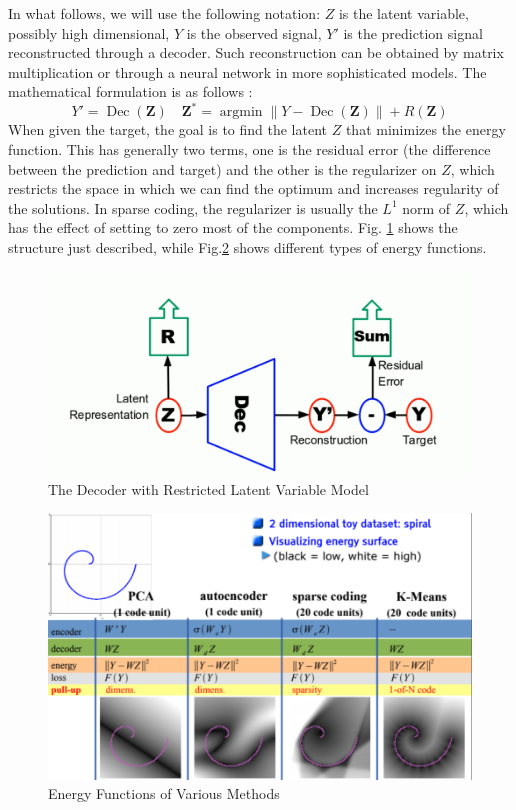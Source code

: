 In what follows, we will use the following notation: $Z$ is the latent variable, possibly high dimensional, $Y$ is the observed signal, $Y'$ is the prediction signal reconstructed through a decoder. Such reconstruction can be obtained by matrix multiplication or through a neural network in more sophisticated models. The mathematical formulation is as follows : 
\[Y'=\operatorname{Dec}(\mathbf{Z}) \quad \mathbf{Z}^{*}=\operatorname{argmin}\|Y-\operatorname{Dec}(\mathbf{Z})\|+R(\mathbf{Z})\]
When given the target, the goal is to find the latent $Z$ that minimizes the energy function. This has generally two terms, one is the residual error (the difference between the prediction and target) and the other is the regularizer on $Z$, which restricts the space in which we can find the optimum and increases regularity of the solutions. In sparse coding, the regularizer is usually the $L^1$ norm of $Z$, which has the effect of setting to zero most of the components. Fig. \ref{fig:decoder} shows the structure just described, while Fig.\ref{fig:energy} shows different types of energy functions.
\begin{figure}[H]
\centering
\includegraphics[width=1.0\linewidth]{figs/decoder.png}
\caption{The Decoder with Restricted Latent Variable Model}
\label{fig:decoder}
\end{figure}
\begin{figure}[H]
\centering
\includegraphics[width=0.8\linewidth]{figs/ernergy.png}
\caption{Energy Functions of Various Methods}

\label{fig:energy}
\end{figure}
